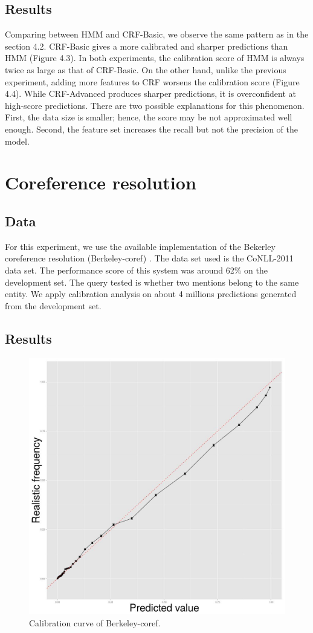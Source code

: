 \subsection{Results}

Comparing between HMM and CRF-Basic, we observe the same pattern as in the section 4.2. CRF-Basic gives a more calibrated and sharper predictions than HMM (Figure 4.3). In both experiments, the calibration score of HMM is always twice as large as that of CRF-Basic. On the other hand, unlike the previous experiment, adding more features to CRF worsens the calibration score (Figure 4.4). While CRF-Advanced produces sharper predictions, it is overconfident at high-score predictions. There are two possible explanations for this phenomenon. First, the data size is smaller; hence, the score may be not approximated well enough. Second, the feature set increases the recall but not the precision of the model.

\section{Coreference resolution}

\subsection{Data}

For this experiment, we use the available implementation of the Bekerley coreference resolution (Berkeley-coref) \citep{durrett2013easy}. The data set used is the CoNLL-2011 data set. The performance score of this system was around 62\% on the development set. The query tested is whether two mentions belong to the same entity. We apply calibration analysis on about 4 millions predictions generated from the development set. 

\subsection{Results}

\begin{figure}[t]
  \centering
  \includegraphics[width=0.5\linewidth]{coref.jpg}
  \caption{Calibration curve of Berkeley-coref.} 
\end{figure}

